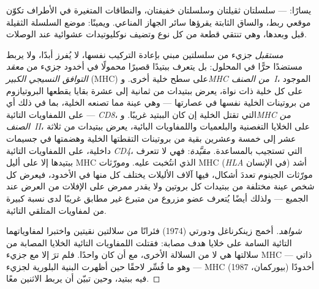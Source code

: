 \begin{omfigure}
{\small يسارًا:  --- سلسلتان ثقيلتان وسلسلتان خفيفتان،
والنطاقات المتغيرة في الأطراف تكوّن موقعي ربط، والساق
الثابتة يقرؤها سائر الجهاز المناعي. ويمينًا: موضع السلسلة
الثقيلة قبل  وبعدها، وهي تنتقي قطعة من كل
نوع وتضيف نوكليوتيدات عشوائية عند الوصلات.}
\end{omfigure}

\begin{definition}\label{def:b3:adaptive-immunity:mhc}
\emph{مستقبل } جزيء من سلسلتين مبني بإعادة
التركيب نفسها، لا يُفرز أبدًا، ولا يربط مستضدًا حرًّا في
المحلول: بل يتعرف ببتيدًا قصيرًا محمولًا في أخدود جزيء من
\emph{معقد التوافق النسيجي الكبير} (MHC) على سطح خلية أخرى.
و\emph{MHC من الصنف~I}، الموجود على كل خلية ذات نواة، يعرض
ببتيدات من ثمانية إلى عشرة بقايا يقطعها البروتيازوم من
بروتينات الخلية نفسها في عصارتها --- وهي عينة مما تصنعه
الخلية، بما في ذلك أي  --- على اللمفاويات التائية
\emph{CD8}، التي تقتل الخلية إن كان الببتيد غريبًا.
و\emph{MHC من الصنف~II}، على الخلايا التغصنية والبلعميات
واللمفاويات البائية، يعرض ببتيدات من ثلاثة عشر إلى خمسة
وعشرين بقية من بروتينات التقطتها الخلية وهضمتها في جسيمات
داخلية، على اللمفاويات التائية \emph{CD4}، التي تستجيب
بالمساعدة.  \emph{مقيَّدة}: فهي لا تتعرف
ببتيدها إلا على أليل MHC الذي انتُخبت عليه. ومورّثات MHC
(\emph{HLA} في الإنسان) أشد مورّثات الجينوم تعددَ أشكال،
فيها آلاف الأليلات يختلف كل منها في الأخدود، فيعرض كل شخص
عينة مختلفة من ببتيدات كل بروتين ولا يقدر ممرض على الإفلات
من العرض عند الجميع --- ولذلك أيضًا يُتعرف عضو مزروع من
متبرع غير مطابق غريبًا لدى نسبة كبيرة من لمفاويات المتلقي
التائية.
\end{definition}

\begin{proof}[شواهد]
أخمج زينكرناغل ودورتي (1974) فئرانًا من سلالتين نقيتين
 واختبرا لمفاوياتهما التائية السامة على خلايا هدف
مصابة: فقتلت اللمفاويات التائية الخلايا المصابة من سلالتها
هي لا من السلالة الأخرى، مع أن  كان واحدًا. فلم ترَ
  إلا مع جزيء MHC ذاتي ---
\emph{} --- وهو ما فُسِّر لاحقًا حين
أظهرت البنية البلورية لجزيء MHC (بيوركمان، 1987) أخدودًا
فيه ببتيد، وحين تبيّن أن  يربط
الاثنين معًا.
\end{proof}

